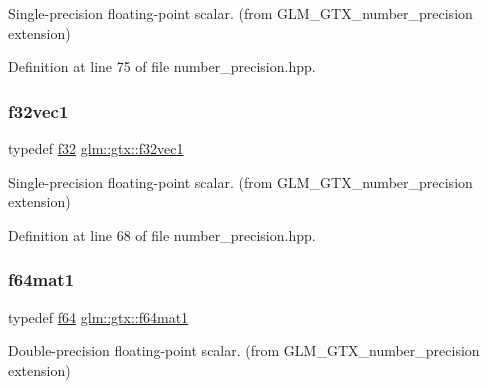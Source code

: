 Single-\/precision floating-\/point scalar. (from G\+L\+M\+\_\+\+G\+T\+X\+\_\+number\+\_\+precision extension) 



Definition at line 75 of file number\+\_\+precision.\+hpp.

\mbox{\label{group__gtx__number__precision_gadab8e598b0b4697629482682bdb7f223}} 
\subsubsection{\texorpdfstring{f32vec1}{f32vec1}}
{\footnotesize\ttfamily typedef \hyperlink{group__gtc__type__precision_ga0ec999b57f5330d9021256e96038df04}{f32} \hyperlink{group__gtx__number__precision_gadab8e598b0b4697629482682bdb7f223}{glm\+::gtx\+::f32vec1}}



Single-\/precision floating-\/point scalar. (from G\+L\+M\+\_\+\+G\+T\+X\+\_\+number\+\_\+precision extension) 



Definition at line 68 of file number\+\_\+precision.\+hpp.

\mbox{\label{group__gtx__number__precision_ga23f8f53c78b50aa07a113c3d07d01bc9}} 
\subsubsection{\texorpdfstring{f64mat1}{f64mat1}}
{\footnotesize\ttfamily typedef \hyperlink{group__gtc__type__precision_ga2bba392e555124b36cde6abba349bab3}{f64} \hyperlink{group__gtx__number__precision_ga23f8f53c78b50aa07a113c3d07d01bc9}{glm\+::gtx\+::f64mat1}}



Double-\/precision floating-\/point scalar. (from G\+L\+M\+\_\+\+G\+T\+X\+\_\+number\+\_\+precision extension) 



